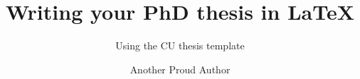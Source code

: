 \documentclass[a4paper,12pt,times,print,index]{Classes/CUPhDThesis}
\title{Writing your PhD thesis in \texorpdfstring{\LaTeX}{LaTeX}}
\subtitle{Using the CU thesis template}
\author{Another Proud Author}
\begin{document}
\frontmatter

\maketitle


\ifdefinefinalsub

\fi



\ifdefinefinalsub

\else

\fi






\tableofcontents

\listoffigures

\listoftables


\printnomenclature

\mainmatter





%
%
%
\end{document}
